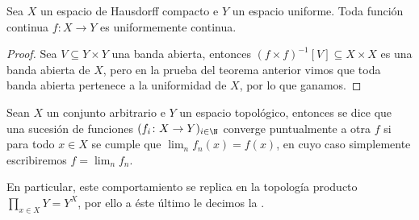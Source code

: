 \documentclass[topologia-analisis.tex]{subfiles}
\begin{document}
\begin{cor}
	Sea $X$ un espacio de Hausdorff compacto e $Y$ un espacio uniforme.
	Toda función continua $f \colon X \to Y$ es uniformemente continua.
\end{cor}
\begin{proof}
	Sea $V \subseteq Y\times Y$ una banda abierta, entonces $(f\times f)^{-1}[V] \subseteq X\times X$ es una banda abierta de $X$,
	pero en la prueba del teorema anterior vimos que toda banda abierta pertenece a la uniformidad de $X$, por lo que ganamos.
\end{proof}


\begin{mydef}
	Sean $X$ un conjunto arbitrario e $Y$ un espacio topológico, entonces se dice que una sucesión de funciones $(f_i\colon X \to Y)_{i\in\N}$
	converge puntualmente a otra $f$ si para todo $x\in X$ se cumple que $\lim_n f_n(x) = f(x)$, en cuyo caso simplemente escribiremos $f = \lim_n f_n$.

	En particular, este comportamiento se replica en la topología producto $\prod_{x\in X} Y = Y^X$,
	por ello a éste último le decimos la .
\end{mydef}
\end{document}
